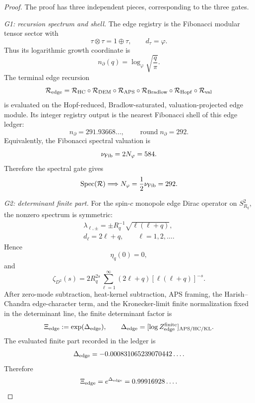 \documentclass[aps,prd,reprint,nofootinbib,superscriptaddress,floatfix]{revtex4-2}
\numberwithin{equation}{section}
\theoremstyle{definition}
\theoremstyle{plain}
\begin{document}
\begin{proof}
The proof has three independent pieces, corresponding to the three gates.

\emph{G1: recursion spectrum and shell.}
The edge registry is the Fibonacci modular tensor sector with
\[
\tau\otimes\tau=1\oplus\tau,
\qquad
d_\tau=\varphi .
\]
Thus its logarithmic growth coordinate is
\[
n_\partial(q)=\log_\varphi\sqrt{\frac q\pi}.
\]
The terminal edge recursion
\[
\mathcal R_{\rm edge}
=
\mathcal R_{\rm HC}
\circ\mathcal R_{\rm DEM}
\circ\mathcal R_{\rm APS}
\circ\mathcal R_{\rm Bradlow}
\circ\mathcal R_{\rm Hopf}
\circ\mathcal R_{\rm val}
\]
is evaluated on the Hopf-reduced, Bradlow-saturated, valuation-projected edge
module.  Its integer registry output is the nearest Fibonacci shell of this
edge ledger:
\[
n_\partial=291.93668\ldots,
\qquad
\operatorname{round}n_\partial=292.
\]
Equivalently, the Fibonacci spectral valuation is
\[
\nu_{\rm Fib}=2N_\varphi=584.
\]
Therefore the spectral gate gives
\[
\operatorname{Spec}(\mathcal R)
\Longrightarrow
N_\varphi=\frac12\nu_{\rm Fib}=292.
\]

\emph{G2: determinant finite part.}
For the spin-\(c\) monopole edge Dirac operator on \(S^2_{R_q}\), the nonzero
spectrum is symmetric:
\[
\begin{gathered}
\lambda_{\ell,\pm}
=
\pm R_q^{-1}\sqrt{\ell(\ell+q)},\\
d_\ell=2\ell+q,
\qquad
\ell=1,2,\ldots .
\end{gathered}
\]
Hence
\[
\eta_q(0)=0,
\]
and
\[
\zeta_{D^2}(s)
=
2R_q^{2s}
\sum_{\ell=1}^{\infty}
(2\ell+q)[\ell(\ell+q)]^{-s}.
\]
After zero-mode subtraction, heat-kernel subtraction, APS framing, the
Harish--Chandra edge-character term, and the Kronecker-limit finite
normalization fixed in the determinant line, the finite determinant factor is
\[
\Xi_{\rm edge}:=\exp(\Delta_{\rm edge}),
\qquad
\Delta_{\rm edge}
=
[\log Z_{\rm edge}^{\rm finite}]_{\rm APS/HC/KL}.
\]
The evaluated finite part recorded in the ledger is
\[
\Delta_{\rm edge}
=
-0.000831065239070442\ldots .
\]
Therefore
\[
\Xi_{\rm edge}
=
e^{\Delta_{\rm edge}}
=
0.99916928\ldots .
\]


\end{proof}
\end{document}
